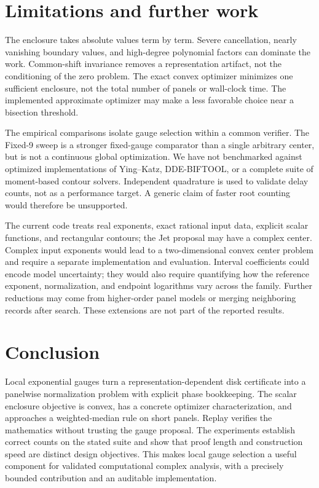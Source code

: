\documentclass[11pt,a4paper]{article}
\begin{document}
\section{Limitations and further work}
The enclosure takes absolute values term by term. Severe cancellation, nearly vanishing boundary values, and high-degree polynomial factors can dominate the work. Common-shift invariance removes a representation artifact, not the conditioning of the zero problem. The exact convex optimizer minimizes one sufficient enclosure, not the total number of panels or wall-clock time. The implemented approximate optimizer may make a less favorable choice near a bisection threshold.

The empirical comparisons isolate gauge selection within a common verifier. The Fixed-9 sweep is a stronger fixed-gauge comparator than a single arbitrary center, but is not a continuous global optimization. We have not benchmarked against optimized implementations of Ying--Katz, DDE-BIFTOOL, or a complete suite of moment-based contour solvers. Independent quadrature is used to validate delay counts, not as a performance target. A generic claim of faster root counting would therefore be unsupported.

The current code treats real exponents, exact rational input data, explicit scalar functions, and rectangular contours; the Jet proposal may have a complex center. Complex input exponents would lead to a two-dimensional convex center problem and require a separate implementation and evaluation. Interval coefficients could encode model uncertainty; they would also require quantifying how the reference exponent, normalization, and endpoint logarithms vary across the family. Further reductions may come from higher-order panel models or merging neighboring records after search. These extensions are not part of the reported results.

\section{Conclusion}
Local exponential gauges turn a representation-dependent disk certificate into a panelwise normalization problem with explicit phase bookkeeping. The scalar enclosure objective is convex, has a concrete optimizer characterization, and approaches a weighted-median rule on short panels. Replay verifies the mathematics without trusting the gauge proposal. The experiments establish correct counts on the stated suite and show that proof length and construction speed are distinct design objectives. This makes local gauge selection a useful component for validated computational complex analysis, with a precisely bounded contribution and an auditable implementation.
\end{document}
